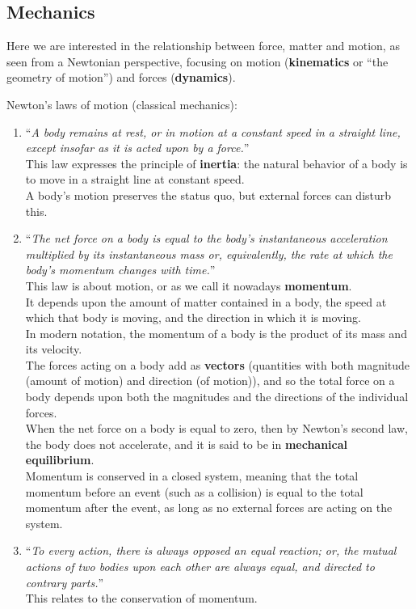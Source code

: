 \subsection{Mechanics}\label{subsec:mechanics}

Here we are interested in the relationship between force, matter and motion, as seen from a Newtonian perspective, focusing on motion (\textbf{kinematics} or ``the geometry of motion'') and forces (\textbf{dynamics}).

Newton's laws of motion (classical mechanics):

\begin{enumerate}
    \item ``\textit{A body remains at rest, or in motion at a constant speed in a straight line, except insofar as it is acted upon by a force.}'' \\
    This law expresses the principle of \textbf{\gls{inertia}}: the natural behavior of a body is to move in a straight line at constant speed. \\
    A body's motion preserves the status quo, but external forces can disturb this.
    \item ``\textit{The net force on a body is equal to the body's instantaneous acceleration multiplied by its instantaneous mass or, equivalently, the rate at which the body's momentum changes with time.}'' \\
    This law is about motion, or as we call it nowadays \textbf{\gls{momentum}}. \\
    It depends upon the amount of matter contained in a body, the speed at which that body is moving, and the direction in which it is moving. \\
    In modern notation, the momentum of a body is the product of its mass and its velocity. \\
    The forces acting on a body add as \textbf{\gls{vector}s} (quantities with both magnitude (amount of motion) and direction (of motion)), and so the total force on a body depends upon both the magnitudes and the directions of the individual forces. \\
    When the net force on a body is equal to zero, then by Newton's second law, the body does not accelerate, and it is said to be in \textbf{mechanical equilibrium}. \\
    Momentum is conserved in a closed system, meaning that the total momentum before an event (such as a collision) is equal to the total momentum after the event, as long as no external forces are acting on the system.
    \item ``\textit{To every action, there is always opposed an equal reaction; or, the mutual actions of two bodies upon each other are always equal, and directed to contrary parts.}'' \\
    This relates to the conservation of momentum.
\end{enumerate}

